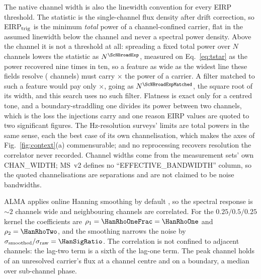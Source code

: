 The native channel width is also the linewidth convention for every EIRP
threshold. The statistic is the single-channel flux density after drift
correction, so EIRP$_{\rm trig}$ is the minimum \emph{total} power of a
channel-confined carrier, flat in the assumed linewidth below the channel and
never a spectral power density. Above the channel it is not a threshold at
all: spreading a fixed total power over $N$ channels lowers the statistic as
$N^{\ScNBroadExp}$, measured on Eq.~\ref{eq:tstar} as the power recovered nine
times in ten, so a feature as wide as the widest line these fields resolve
(\ScNBroadChan{} channels) must carry \ScNBroadRatio$\times$ the power of a
carrier. A filter matched to such a feature would pay only
\ScNBroadRatioMatched$\times$, going as $N^{\ScNBroadExpMatched}$, the square
root of its width, and this search uses no such filter. Flatness is exact only for a centred tone,
and a boundary-straddling one divides its power between two channels, which
is the loss the injections carry and one reason EIRP values are quoted to two
significant figures. The Hz-resolution
surveys' limits are total powers in the same sense, each the best case of
its own channelisation, which makes the axes of Fig.~\ref{fig:context}(a)
commensurable; and no reprocessing recovers resolution the correlator never
recorded. Channel widths come from the measurement sets' own CHAN\_WIDTH;
MS~v2 defines no ``EFFECTIVE\_BANDWIDTH'' column, so the quoted
channelisations are separations and are not claimed to be noise bandwidths.

ALMA applies online Hanning smoothing by default \citep{ALMAHandbook}, so
the spectral response is ${\sim}2$ channels wide and neighbouring channels
are correlated. For the $0.25/0.5/0.25$ kernel the coefficients
are $\rho_1=\HanRhoOneFrac=\HanRhoOne$ and $\rho_2=\HanRhoTwo$, and the
smoothing narrows the noise by
$\sigma_{\rm smoothed}/\sigma_{\rm raw}=\HanSigRatio$. The correlation is
not confined to adjacent channels: the lag-two term is a sixth of the
lag-one term. The peak
channel holds \HanBest{} of an unresolved carrier's flux at a channel centre
and \HanWorst{} on a boundary, a median \HanMed{} over sub-channel phase.

